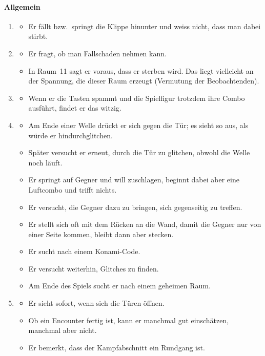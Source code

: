 \documentclass[../Main.tex]{subfiles}
\begin{document}
\paragraph{Allgemein}
\begin{enumerate}[label=\textbf{B\arabic*}, leftmargin=1.5cm, itemsep=0.8em, resume]
    \item
        \begin{itemize}[nosep]
            \item Er fällt bzw.\ springt die Klippe hinunter und weiss nicht, dass man dabei stirbt.
        \end{itemize}
    \item
        \begin{itemize}[nosep]
            \item Er fragt, ob man Fallschaden nehmen kann.
            \item In Raum~11 sagt er voraus, dass er sterben wird. Das liegt vielleicht an der Spannung, die dieser Raum erzeugt (Vermutung der Beobachtenden).
        \end{itemize}
    \item
        \begin{itemize}[nosep]
            \item Wenn er die Tasten spammt und die Spielfigur trotzdem ihre Combo ausführt, findet er das witzig.
        \end{itemize}
    \item
        \begin{itemize}[nosep]
            \item Am Ende einer Welle drückt er sich gegen die Tür; es sieht so aus, als würde er hindurchglitchen.
            \item Später versucht er erneut, durch die Tür zu glitchen, obwohl die Welle noch läuft.
            \item Er springt auf Gegner und will zuschlagen, beginnt dabei aber eine Luftcombo und trifft nichts.
            \item Er versucht, die Gegner dazu zu bringen, sich gegenseitig zu treffen.
            \item Er stellt sich oft mit dem Rücken an die Wand, damit die Gegner nur von einer Seite kommen, bleibt dann aber stecken.
            \item Er sucht nach einem Konami-Code.
            \item Er versucht weiterhin, Glitches zu finden.
            \item Am Ende des Spiels sucht er nach einem geheimen Raum.
        \end{itemize}
    \item
        \begin{itemize}[nosep]
            \item Er sieht sofort, wenn sich die Türen öffnen.
            \item Ob ein Encounter fertig ist, kann er manchmal gut einschätzen, manchmal aber nicht.
            \item Er bemerkt, dass der Kampfabschnitt ein Rundgang ist.
        \end{itemize}
\end{enumerate}
\end{document}
